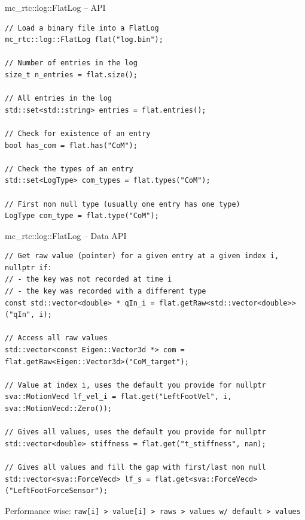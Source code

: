 \documentclass[c,aspectratio=169]{beamer}
\begin{document}
\begin{frame}[fragile]{mc\_rtc::log::FlatLog -- API}

  \scriptsize
  \begin{block}{}
    \begin{verbatim}
// Load a binary file into a FlatLog
mc_rtc::log::FlatLog flat("log.bin");

// Number of entries in the log
size_t n_entries = flat.size();

// All entries in the log
std::set<std::string> entries = flat.entries();

// Check for existence of an entry
bool has_com = flat.has("CoM");

// Check the types of an entry
std::set<LogType> com_types = flat.types("CoM");

// First non null type (usually one entry has one type)
LogType com_type = flat.type("CoM");
    \end{verbatim}
  \end{block}

\end{frame}

\begin{frame}[fragile]{mc\_rtc::log::FlatLog -- Data API}

  \scriptsize
  \begin{block}{}
    \begin{verbatim}
// Get raw value (pointer) for a given entry at a given index i, nullptr if:
// - the key was not recorded at time i
// - the key was recorded with a different type
const std::vector<double> * qIn_i = flat.getRaw<std::vector<double>>("qIn", i);

// Access all raw values
std::vector<const Eigen::Vector3d *> com = flat.getRaw<Eigen::Vector3d>("CoM_target");

// Value at index i, uses the default you provide for nullptr
sva::MotionVecd lf_vel_i = flat.get("LeftFootVel", i, sva::MotionVecd::Zero());

// Gives all values, uses the default you provide for nullptr
std::vector<double> stiffness = flat.get("t_stiffness", nan);

// Gives all values and fill the gap with first/last non null
std::vector<sva::ForceVecd> lf_s = flat.get<sva::ForceVecd>("LeftFootForceSensor");
    \end{verbatim}
  \end{block}

  \vfill

  \hfill Performance wise: \verb|raw[i] > value[i] > raws > values w/ default > values|

\end{frame}
\end{document}
